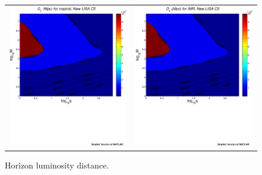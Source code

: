 \documentclass{iopart}
\begin{document}
\begin{figure}[H]
\begin{center}
\begin{tabular}{cc}
\includegraphics[scale=0.41,clip=true]{FigEmanuele/C5InspDLContour.ps}
&\includegraphics[scale=0.41,clip=true]{FigEmanuele/C5IMRDLContour.ps}\\
\end{tabular}
\caption{\label{fig:SNRMiniLISA7} Horizon luminosity distance.}
\end{center}
\end{figure}
%
\end{document}
